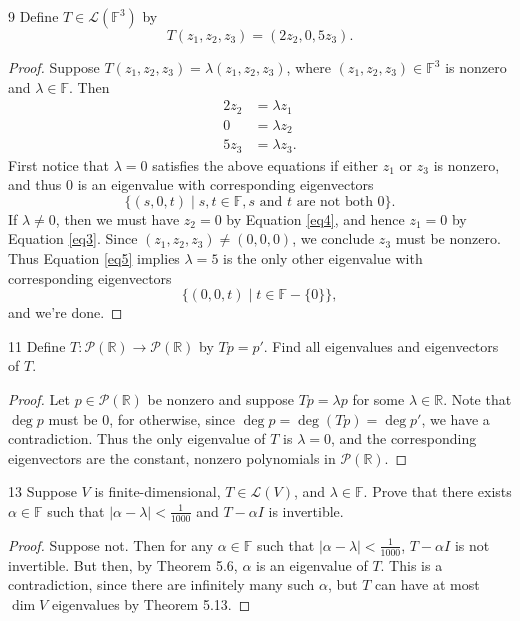 \documentclass{extarticle}
\newenvironment{problem}[1]{\begin{prob*}{#1}{}}{\end{prob*}}
\newcommand{\R}{\mathbb{R}}
\newcommand{\F}{\mathbb{F}}
\newcommand{\poly}{\mathcal{P}}
\newcommand{\Hom}{\mathcal{L}}
\begin{document}
\begin{problem}{9}
Define $T\in\Hom\left(\F^3\right)$ by
\begin{equation*}
T(z_1, z_2, z_3) = (2z_2, 0, 5z_3).
\end{equation*}
\end{problem}
\begin{proof}
Suppose $T(z_1, z_2, z_3) = \lambda(z_1,z_2,z_3)$, where $(z_1,z_2, z_3)\in\F^3$ is nonzero and $\lambda\in\F$.  Then
\begin{align}
2z_2 &= \lambda z_1\label{eq3} \\
0 &= \lambda z_2 \label{eq4} \\
5z_3 &= \lambda z_3. \label{eq5} 
\end{align}
First notice that $\lambda = 0$ satisfies the above equations if either $z_1$ or $z_3$ is nonzero, and thus $0$ is an eigenvalue with corresponding eigenvectors 
\begin{equation*}
\{(s, 0, t)\mid s,t\in\F, s\text{ and }t\text{ are not both }0\}.
\end{equation*}  
If $\lambda\neq 0$, then we must have $z_2 = 0$ by Equation \ref{eq4}, and hence $z_1 = 0$ by Equation \ref{eq3}.  Since $(z_1,z_2, z_3)\neq (0, 0, 0)$, we conclude $z_3$ must be nonzero.  Thus Equation \ref{eq5} implies $\lambda = 5$ is the only other eigenvalue with corresponding eigenvectors
\begin{equation*} 
\{(0, 0, t)\mid t\in\F-\{0\}\},
\end{equation*}
and we're done.
\end{proof}

\begin{problem}{11}
Define $T:\poly(\R)\to\poly(\R)$ by $Tp = p'$.  Find all eigenvalues and eigenvectors of $T$.
\end{problem}
\begin{proof}
Let $p\in\poly(\R)$ be nonzero and suppose $Tp = \lambda p$ for some $\lambda\in\R$.  Note that $\deg p$ must be $0$, for otherwise, since $\deg p = \deg(Tp) = \deg p'$, we have a contradiction.  Thus the only eigenvalue of $T$ is $\lambda = 0$, and the corresponding eigenvectors are the constant, nonzero polynomials in $\poly(\R)$.  
\end{proof}

\begin{problem}{13}
Suppose $V$ is finite-dimensional, $T\in\Hom(V)$, and $\lambda\in\F$.  Prove that there exists $\alpha\in\F$ such that $\left|\alpha-\lambda\right| < \frac{1}{1000}$ and $T-\alpha I$ is invertible.
\end{problem}
\begin{proof}
Suppose not.  Then for any $\alpha\in\F$ such that $\left|\alpha-\lambda\right| < \frac{1}{1000}$, $T - \alpha I$ is not invertible.  But then, by Theorem 5.6, $\alpha$ is an eigenvalue of $T$.  This is a contradiction, since there are infinitely many such $\alpha$, but $T$ can have at most $\dim V$ eigenvalues by Theorem 5.13. 
\end{proof} 
\end{document}
